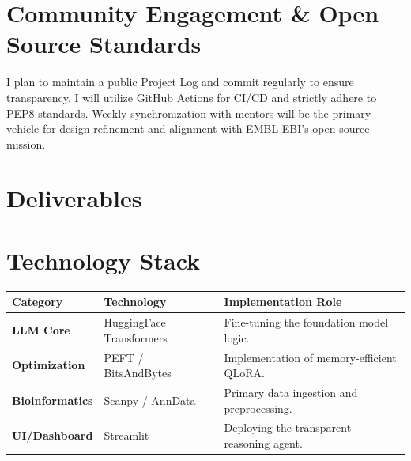 \documentclass[12pt,a4paper]{article}
\begin{document}
\section{Community Engagement \& Open Source Standards}
I plan to maintain a public Project Log and commit regularly to ensure transparency. I will utilize GitHub Actions for CI/CD and strictly adhere to PEP8 standards. Weekly synchronization with mentors will be the primary vehicle for design refinement and alignment with EMBL-EBI's open-source mission.

\section{Deliverables}
\begin{table}[h!]
\centering
{}
\end{table}

\section{Technology Stack}
\begin{table}[h!]
\centering
\begin{tabular}{@{}lll@{}}
\toprule
\textbf{Category} & \textbf{Technology} & \textbf{Implementation Role} \\ \midrule
\textbf{LLM Core} & HuggingFace Transformers & Fine-tuning the foundation model logic. \\
\textbf{Optimization} & PEFT / BitsAndBytes & Implementation of memory-efficient QLoRA. \\
\textbf{Bioinformatics} & Scanpy / AnnData & Primary data ingestion and preprocessing. \\
\textbf{UI/Dashboard} & Streamlit & Deploying the transparent reasoning agent. \\ \bottomrule
\end{tabular}
\end{table}
\end{document}
